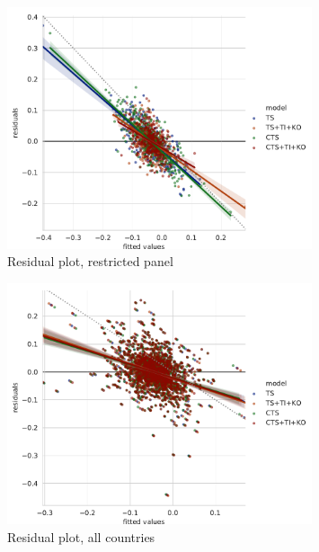 \documentclass[12pt,a4paper]{article}
\begin{document}
\begin{figure}[htbp]
\centering
\includegraphics[width=0.8\textwidth]{./plots/dis/diffGMM_residual_plot_subset.pdf}
\caption{Residual plot, restricted panel}
\label{fig:gmm_residual_plot_subset}
\end{figure}

\begin{figure}[htbp]
\centering
\includegraphics[width=0.8\textwidth]{./plots/dis/diffGMM_residual_plot_all.pdf}
\caption{Residual plot, all countries}
\label{fig:gmm_residual_plot_all}
\end{figure}

\restoregeometry{}
\end{document}
